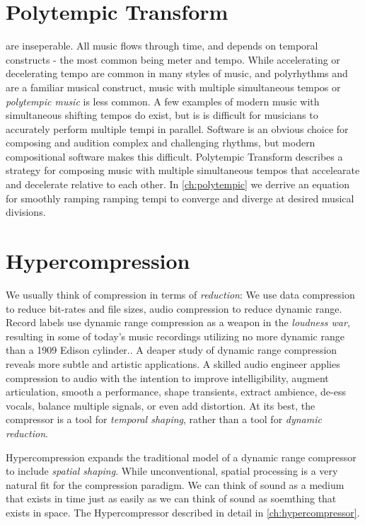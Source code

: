 \documentclass{tufte-book}
\newcommand{\thesis}{Hypercompression\xspace}
\newcommand{\polytempic}{Polytempic Transform\xspace}
\begin{document}
\section{\polytempic}
\label{sec:polytempic-intro}

 are inseperable. All music flows through
time, and depends on temporal constructs - the most common being meter
and tempo. While accelerating or decelerating tempo are common in many
styles of music, and polyrhythms and are a familiar musical construct,
music with multiple simultaneous tempos or \textit{polytempic music}
is less common. A few examples of modern music with simultaneous
shifting tempos do exist, but is is difficult for musicians to
accurately perform multiple tempi in parallel. Software is an obvious
choice for composing and audition complex and challenging rhythms, but
modern compositional software makes this difficult. \polytempic
describes a strategy for composing music with multiple simultaneous
tempos that accelearate and decelerate relative to each other. In
\autoref{ch:polytempic} we derrive an equation for smoothly ramping
ramping tempi to converge and diverge at desired musical divisions.

\section{\thesis}
\label{sec:hypercompression-intro}
 We usually think
of compression in terms of \emph{reduction}: We use data compression
to reduce bit-rates and file sizes, audio compression to reduce
dynamic range. Record labels use dynamic range compression as a weapon
in the \emph{loudness war}\cite{Deruty2014a}, resulting in some of
today's music recordings utilizing no more dynamic range than a 1909
Edison cylinder.\cite{Katz2007}. A deaper study of dynamic range
compression reveals more subtle and artistic applications. A skilled
audio engineer applies compression to audio with the intention to
improve intelligibility, augment articulation, smooth a performance,
shape transients, extract ambience, de-ess vocals, balance multiple
signals, or even add distortion.\cite{Case2007} At its best, the
compressor is a tool for \emph{temporal shaping}, rather than a tool
for \emph{dynamic reduction}.

\thesis expands the traditional model of a dynamic range compressor to
include \emph{spatial shaping}. While unconventional, spatial
processing is a very natural fit for the compression paradigm. We can
think of sound as a medium that exists in time just as easily as we
can think of sound as soemthing that exists in
space. The Hypercompressor described in detail in
\autoref{ch:hypercompressor}.
\end{document}
